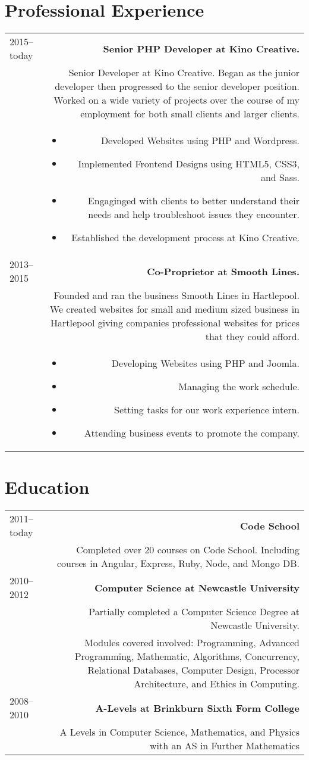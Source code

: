\documentclass[10pt]{article}
\begin{document}
\section*{Professional Experience}
\begin{tabular}{L!{\VRule}R}
2015--today&{\bf Senior PHP Developer at Kino Creative.}\\
&Senior Developer at Kino Creative. Began as the junior developer then progressed to the senior developer position. Worked on a wide variety of projects over the course of my employment for both small clients and larger clients.\\
&\begin{itemize}
\item Developed Websites using PHP and Wordpress.
\item Implemented Frontend Designs using HTML5, CSS3, and Sass.
\item Engaginged with clients to better understand their needs and help troubleshoot issues they encounter.
\item Established the development process at Kino Creative.
\end{itemize}\\
2013--2015&{\bf Co-Proprietor at Smooth Lines.}\\
&Founded and ran the business Smooth Lines in Hartlepool. We created websites for small and medium sized business in Hartlepool giving companies professional websites for prices that they could afford.\\
&\begin{itemize}
\item Developing Websites using PHP and Joomla.
\item Managing the work schedule.
\item Setting tasks for our work experience intern.
\item Attending business events to promote the company.
\end{itemize}\\
\end{tabular}

\section*{Education}
\begin{tabular}{L!{\VRule}R}
2011--today&{\bf Code School}\\
&Completed over 20 courses on Code School. Including courses in Angular, Express, Ruby, Node, and Mongo DB.\\
2010--2012&{\bf Computer Science at Newcastle University}\\
&Partially completed a Computer Science Degree at Newcastle University.\\
&Modules covered involved: Programming, Advanced Programming, Mathematic, Algorithms, Concurrency, Relational Databases, Computer Design, Processor Architecture, and Ethics in Computing.\\
2008--2010&{\bf A-Levels at Brinkburn Sixth Form College}\\
&A Levels in Computer Science, Mathematics, and Physics with an AS in Further Mathematics
\end{tabular}
\end{document}
